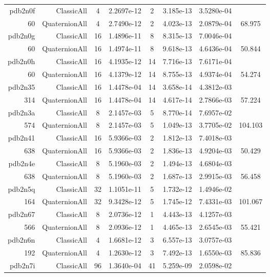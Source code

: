 \begin{xltabular}{\textwidth}{r|rcS[table-format=1.4e+2]cS[table-format=1.3e+2]S[table-format=1.4e+2]S[table-format=-1.3]}
pdb2n0f & ClassicAll & 4 & 2.2697e-12 & 2 & 3.185e-13 & 3.5280e-04 & \\
60 & QuaternionAll & 4 & 2.7490e-12 & 2 & 4.023e-13 & 2.0879e-04 & 68.975\\  \addlinespace
pdb2n0g & ClassicAll & 16 & 1.4896e-11 & 8 & 8.315e-13 & 7.0046e-04 & \\
60 & QuaternionAll & 16 & 1.4974e-11 & 8 & 9.618e-13 & 4.6436e-04 & 50.844\\  \addlinespace
pdb2n0h & ClassicAll & 16 & 4.1935e-12 & 14 & 7.716e-13 & 7.6171e-04 & \\
60 & QuaternionAll & 16 & 4.1379e-12 & 14 & 8.755e-13 & 4.9374e-04 & 54.274\\  \addlinespace
pdb2n35 & ClassicAll & 16 & 1.4478e-04 & 14 & 3.658e-14 & 4.3812e-03 & \\
314 & QuaternionAll & 16 & 1.4478e-04 & 14 & 4.617e-14 & 2.7866e-03 & 57.224\\  \addlinespace
pdb2n3a & ClassicAll & 8 & 2.1457e-03 & 5 & 8.770e-14 & 7.6957e-02 & \\
574 & QuaternionAll & 8 & 2.1457e-03 & 5 & 1.049e-13 & 3.7705e-02 & 104.103\\  \addlinespace
pdb2n41 & ClassicAll & 16 & 5.9366e-03 & 2 & 1.812e-13 & 7.4018e-03 & \\
638 & QuaternionAll & 16 & 5.9366e-03 & 2 & 1.836e-13 & 4.9204e-03 & 50.429\\  \addlinespace
pdb2n4e & ClassicAll & 8 & 5.1960e-03 & 2 & 1.494e-13 & 4.6804e-03 & \\
638 & QuaternionAll & 8 & 5.1960e-03 & 2 & 1.687e-13 & 2.9915e-03 & 56.458\\  \addlinespace
pdb2n5q & ClassicAll & 32 & 1.1051e-11 & 5 & 1.732e-12 & 1.4946e-02 & \\
164 & QuaternionAll & 32 & 9.3428e-12 & 5 & 1.745e-12 & 7.4331e-03 & 101.067\\  \addlinespace
pdb2n67 & ClassicAll & 8 & 2.0736e-12 & 1 & 4.443e-13 & 4.1257e-03 & \\
566 & QuaternionAll & 8 & 2.0936e-12 & 1 & 4.465e-13 & 2.6545e-03 & 55.421\\  \addlinespace
pdb2n6n & ClassicAll & 4 & 1.6681e-12 & 3 & 6.557e-13 & 3.0757e-03 & \\
192 & QuaternionAll & 4 & 1.2630e-12 & 3 & 7.492e-13 & 1.6550e-03 & 85.836\\  \addlinespace
pdb2n7i & ClassicAll & 96 & 1.3640e-04 & 41 & 5.259e-09 & 2.0598e-02 & \\

\end{xltabular}
